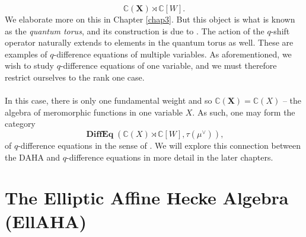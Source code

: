 \documentclass[a4paper]{report}
\theoremstyle{theorem}
\theoremstyle{definition}
\theoremstyle{remark}
\theoremstyle{proposition}
\theoremstyle{conjecture}
\theoremstyle{lemma}
\theoremstyle{corollary}
\theoremstyle{exercise}
\theoremstyle{example}
\newcommand{\C}{\mathbb{C}}
\newcommand{\on}{\operatorname}
\newcommand{\DiffEq}{\on{\mathbf{DiffEq}}}
\begin{document}
  $$\C(\mathbf{X}) \rtimes \C[W].$$
  We elaborate more on this in Chapter \ref{chap3}. But this object is what is known as the 
  \emph{quantum torus}, and its construction is due to \cite{beg00}. The action of the 
  $q$-shift operator naturally extends to elements in the quantum torus as well.
  These are examples of $q$-difference equations of multiple variables. As aforementioned, 
  we wish to study $q$-difference equations of one variable, and we must therefore 
  restrict ourselves to the rank one case. \\\\ 
  In this case, there is only one fundamental weight and so $\C(\mathbf{X}) = \C(X)$ -- 
  the algebra of meromorphic functions in one variable $X$.
  As such, one may form the category 
  $$\DiffEq(\C(X) \rtimes \C[W], \tau(\mu^\vee)),$$
  of $q$-difference equations in the sense of \cite{sauloy03}. 
  We will explore this connection between the DAHA and $q$-difference equations 
  in more detail in the later chapters.
  
  \section{The Elliptic Affine Hecke Algebra (EllAHA)}\label{chap_ellAHA}
  
\end{document}
